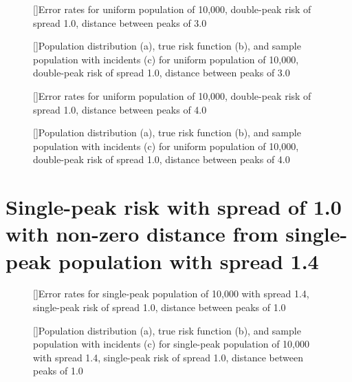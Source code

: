 {%

\begin{figure}[!htb]
    
    []{Error rates for uniform population of 10,000, double-peak risk of \gls{spread} 1.0, distance between peaks of 3.0}
    \label{tab:mean_error_rates:unif_100_1_2h_3}
    
    []{Population distribution (a), true risk function (b), and sample population with incidents (c) for uniform population of 10,000, double-peak risk of \gls{spread} 1.0, distance between peaks of 3.0}
    \label{fig:distributions:unif_100_1_2h_3}    
\end{figure}


\begin{figure}[!htb]
    
    []{Error rates for uniform population of 10,000, double-peak risk of \gls{spread} 1.0, distance between peaks of 4.0}
    \label{tab:mean_error_rates:unif_100_1_2h_4}
    
    []{Population distribution (a), true risk function (b), and sample population with incidents (c) for uniform population of 10,000, double-peak risk of \gls{spread} 1.0, distance between peaks of 4.0}
    \label{fig:distributions:unif_100_1_2h_4}    
\end{figure}

\section{Single-peak risk with spread of 1.0 with non-zero distance from single-peak population with spread 1.4}
\label{sec:app:results_p1.4_100_1_1h_X}


\begin{figure}[!htb]
    
    []{Error rates for single-peak population of 10,000 with \gls{spread} 1.4, single-peak risk of \gls{spread} 1.0, distance between peaks of 1.0}
    \label{tab:mean_error_rates:p1.4_100_1_1h_1s}
    
    []{Population distribution (a), true risk function (b), and sample population with incidents (c) for single-peak population of 10,000 with \gls{spread} 1.4, single-peak risk of \gls{spread} 1.0, distance between peaks of 1.0}
    \label{fig:distributions:p1.4_100_1_1h_1s}    
\end{figure}

}
